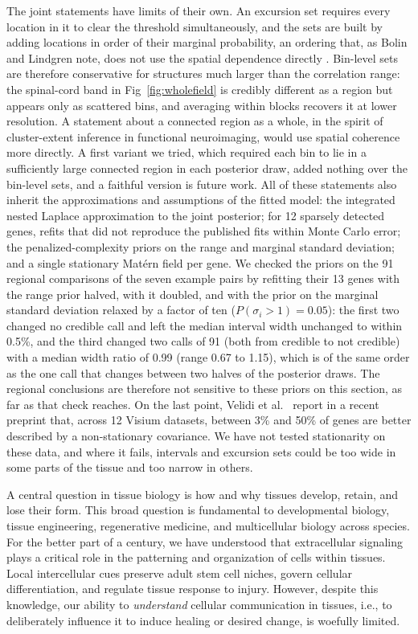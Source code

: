 \documentclass[10pt,letterpaper]{article}
\begin{document}
The joint statements have limits of their own. An excursion set requires every location in it to clear the threshold simultaneously, and the sets are built by adding locations in order of their marginal probability, an ordering that, as Bolin and Lindgren note, does not use the spatial dependence directly \cite{bolin2015excursion}. Bin-level sets are therefore conservative for structures much larger than the correlation range: the spinal-cord band in Fig~\ref{fig:wholefield} is credibly different as a region but appears only as scattered bins, and averaging within blocks recovers it at lower resolution. A statement about a connected region as a whole, in the spirit of cluster-extent inference in functional neuroimaging, would use spatial coherence more directly. A first variant we tried, which required each bin to lie in a sufficiently large connected region in each posterior draw, added nothing over the bin-level sets, and a faithful version is future work. All of these statements also inherit the approximations and assumptions of the fitted model: the integrated nested Laplace approximation to the joint posterior; for 12 sparsely detected genes, refits that did not reproduce the published fits within Monte Carlo error; the penalized-complexity priors on the range and marginal standard deviation; and a single stationary Mat\'ern field per gene. We checked the priors on the 91 regional comparisons of the seven example pairs by refitting their 13 genes with the range prior halved, with it doubled, and with the prior on the marginal standard deviation relaxed by a factor of ten ($P(\sigma_i > 1) = 0.05$): the first two changed no credible call and left the median interval width unchanged to within 0.5\%, and the third changed two calls of 91 (both from credible to not credible) with a median width ratio of 0.99 (range 0.67 to 1.15), which is of the same order as the one call that changes between two halves of the posterior draws. The regional conclusions are therefore not sensitive to these priors on this section, as far as that check reaches. On the last point, Velidi et al.\ \cite{velidi2026nonstationarity} report in a recent preprint that, across 12 Visium datasets, between 3\% and 50\% of genes are better described by a non-stationary covariance. We have not tested stationarity on these data, and where it fails, intervals and excursion sets could be too wide in some parts of the tissue and too narrow in others.

A central question in tissue biology is how and why tissues develop, retain, and lose their form. This broad question is fundamental to developmental biology, tissue engineering, regenerative medicine, and multicellular biology across species. For the better part of a century, we have understood that extracellular signaling plays a critical role in the patterning and organization of cells within tissues. Local intercellular cues preserve adult stem cell niches, govern cellular differentiation, and regulate tissue response to injury. However, despite this knowledge, our ability to \textit{understand} cellular communication in tissues, i.e., to deliberately influence it to induce healing or desired change, is woefully limited.
\end{document}
